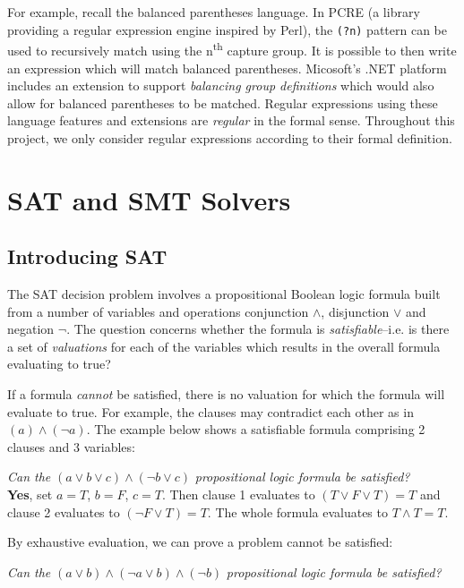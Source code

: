 \documentclass[a4paper,openany]{book}
\begin{document}
For example, recall the balanced parentheses language. In PCRE (a library providing a regular expression engine inspired by Perl), the \texttt{(?n)} pattern can be used to recursively match using the n\textsuperscript{th} capture group. It is possible to then write an expression which will match balanced parentheses. Micosoft's .NET platform includes an extension to support \emph{balancing group definitions} which would also allow for balanced parentheses to be matched. Regular expressions using these language features and extensions are \emph{regular} in the formal sense. Throughout this project, we only consider regular expressions according to their formal definition.

\section{SAT and SMT Solvers}

\subsection{Introducing SAT}

The SAT decision problem involves a propositional Boolean logic formula built from a number of variables and operations conjunction $\land$, disjunction $\lor$ and negation $\neg$. The question concerns whether the formula is \emph{satisfiable}--i.e. is there a set of \emph{valuations} for each of the variables which results in the overall formula evaluating to true?

If a formula \emph{cannot} be satisfied, there is no valuation for which the formula will evaluate to true. For example, the clauses may contradict each other as in $(a) \land (\neg a)$. The example below shows a satisfiable formula comprising 2 clauses and 3 variables:


\emph{Can the} \(
	(a \lor b \lor c) \land (\neg b \lor c)
\) \emph{propositional logic formula be satisfied?}\\

\textcolor{id7-emerald-green}{\textbf{Yes}}, set $a = T$, $b=F$, $c=T$. Then clause 1 evaluates to $(T \lor F \lor T) = T$ and clause 2 evaluates to $(\neg F \lor T) = T$. The whole formula evaluates to $T \land T = T$.

By exhaustive evaluation, we can prove a problem cannot be satisfied:

\emph{Can the} \(
    (a \lor b) \land (\neg a \lor b) \land (\neg b)
\) \emph{propositional logic formula be satisfied?}\\
\end{document}
